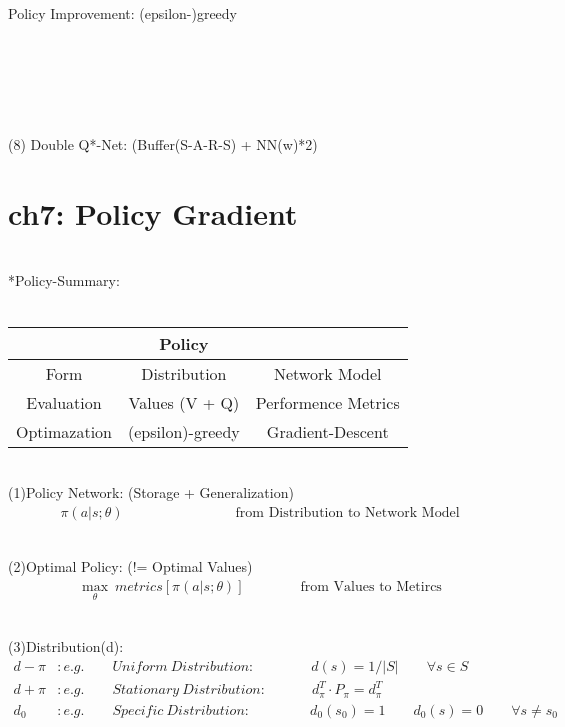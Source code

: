 \documentclass{article}
\begin{document}
~ \\[3pt]
Policy Improvement: (epsilon-)greedy 


~ \\[3pt]
~ \\[3pt]
~ \\[3pt]
~ \\[3pt]
~ \\[3pt]
(8) Double Q*-Net: \qquad (Buffer(S-A-R-S) + NN(w)*2) 


\newpage
\section*{ch7: Policy Gradient}


~ \\[3pt]
*Policy-Summary: \\[3pt]
~ \\[3pt]
\centering
\begin{tabular}{ccc}  %

    \toprule 
        & \qquad \qquad \qquad \qquad \qquad \qquad \qquad Policy & \\[3pt]
    \midrule 
        Form          & Distribution        & Network Model         \\[3pt]
        Evaluation    & Values (V + Q)      & Performence Metrics   \\[3pt]
        Optimazation  & (epsilon)-greedy    & Gradient-Descent      \\[3pt]
    \bottomrule 

\end{tabular}
\flushleft


~ \\[3pt]
(1)Policy Network: (Storage + Generalization) 
\begin{align*}
    \pi (a | s; \theta ) 
    \qquad \qquad \qquad \qquad \text{from Distribution to Network Model} 
\end{align*}

~ \\[3pt]
(2)Optimal Policy: (!= Optimal Values) 
\begin{align*}
    \max_{\theta} \ metrics[ \pi (a | s; \theta ) ] 
    \qquad \qquad \text{from Values to Metircs} 
\end{align*}

~ \\[3pt]
(3)Distribution(d): 
\begin{align*}
    d - \pi &: e.g. 
            \qquad Uniform \ Distribution : \qquad \qquad 
            d(s) = 1 / | S | \qquad \forall s \in S \\[3pt]
    d + \pi &: e.g. 
            \qquad Stationary \ Distribution : \qquad \quad \ 
            d_{\pi}^{T} \cdot P_{\pi} = d_{\pi}^{T} \\[3pt]
    d_{0}   &: e.g. 
            \qquad Specific \ Distribution : \qquad \qquad \ 
            d_{0}(s_{0}) = 1 
            \qquad  d_{0}(s) = 0 \qquad \forall s \neq s_{0} 
\end{align*}
\end{document}
